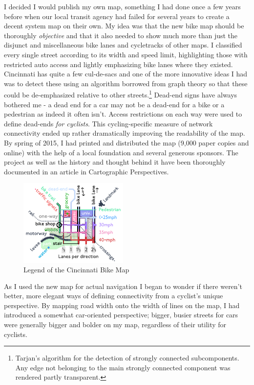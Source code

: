 \documentclass{article}
\begin{document}
		I decided I would publish my own map, something I had done once a few years before when our local transit agency had failed for several years to create a decent system map on their own.
		My idea was that the new bike map should be thoroughly \textit{objective} and that it also needed to show much more than just the disjunct and miscellaneous bike lanes and cycletracks of other maps. I classified every single street according to its width and speed limit, highlighting those with restricted auto access and lightly emphasizing bike lanes where they existed. Cincinnati has quite a few cul-de-sacs and one of the more innovative ideas I had was to detect these using an algorithm borrowed from graph theory so that these could be de-emphasized relative to other streets.\footnote{
			Tarjan's algorithm for the detection of strongly connected subcomponents. Any edge not belonging to the main strongly connected component was rendered partly transparent.
		} Dead-end signs have always bothered me - a dead end for a car may not be a dead-end for a bike or a pedestrian as indeed it often isn't. Access restrictions on each way were used to define dead-ends \textit{for cyclists}. 
		This cycling-specific measure of network connectivity ended up rather dramatically improving the readability of the map. 
		By spring of 2015, I had printed and distributed the map (9,000 paper copies and online) with the help of a local foundation and several generous sponsors. The project as well as the history and thought behind it have been thoroughly documented in an article in Cartographic Perspectives.\cite{Wessel2015}
		\begin{figure}[h!]
			\includegraphics[width=0.48\textwidth]{legend}
			\caption{Legend of the Cincinnati Bike Map}
		\end{figure}
		As I used the new map for actual navigation I began to wonder if there weren't better, more elegant ways of defining connectivity from a cyclist's unique perspective. By mapping road width onto the width of lines on the map, I had introduced a somewhat car-oriented perspective; bigger, busier streets for cars were generally bigger and bolder on my map, regardless of their utility for cyclists. 
		
\end{document}
